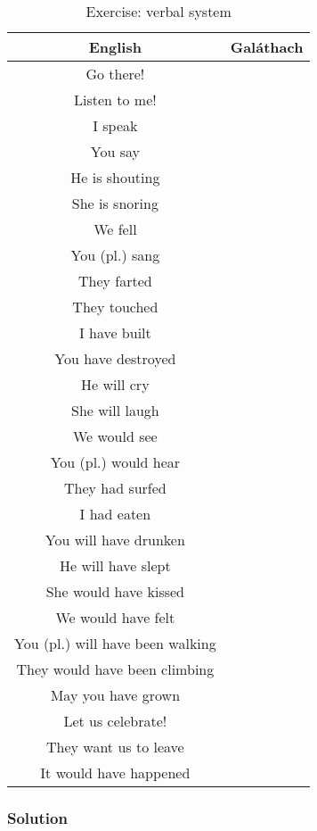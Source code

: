 \begin{table}[H]
\centering
\begin{tabular}{|c|M{5.0cm}|}
  \toprule
  \textbf{English} & \textbf{Gal\'{a}thach}\\
  \toprule
  Go there! & \\
  \midrule
  Listen to me! & \\
  \midrule
  I speak & \\
  \midrule
  You say & \\
  \midrule
  He is shouting & \\
  \midrule
  She is snoring & \\
  \midrule
  We fell & \\
  \midrule
  You (pl.) sang & \\
  \midrule
  They farted & \\
  \midrule
  They touched & \\
  \midrule
  I have built & \\
  \midrule
  You have destroyed & \\
  \midrule
  He will cry & \\
  \midrule
  She will laugh & \\
  \midrule
  We would see & \\
  \midrule
  You (pl.) would hear & \\
  \midrule
  They had surfed & \\
  \midrule
  I had eaten & \\
  \midrule
  You will have drunken & \\
  \midrule
  He will have slept & \\
  \midrule
  She would have kissed & \\
  \midrule
  We would have felt & \\
  \midrule
  You (pl.) will have been walking & \\
  \midrule
  They would have been climbing & \\
  \midrule
  May you have grown & \\
  \midrule
  Let us celebrate! & \\
  \midrule
  They want us to leave & \\
  \midrule
  It would have happened & \\
  \bottomrule
\end{tabular}
\label{exercise_verbal_system}
\caption{Exercise: verbal system}
\end{table}

\newpage
\subsubsection{Solution}

